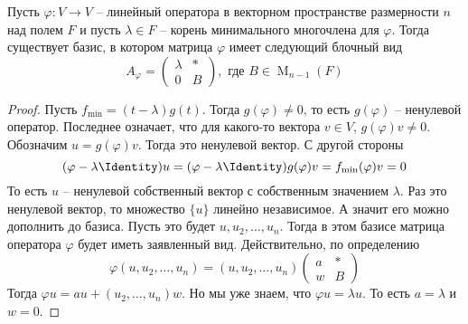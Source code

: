 \begin{claim}
Пусть $\varphi \colon V\to V$ -- линейный оператора в векторном пространстве размерности $n$ над полем $F$ и пусть $\lambda\in F$ -- корень минимального многочлена для $\varphi$.
Тогда существует базис, в котором матрица $\varphi$ имеет следующий блочный вид
\[
A_\varphi = 
\begin{pmatrix}
{\lambda}&{*}\\
{0}&{B}
\end{pmatrix},\text{ где }
B\in \operatorname{M}_{n-1}(F)
\]
\end{claim}
\begin{proof}
Пусть $f_{\text{min}}=(t-\lambda)g(t)$.
Тогда $g(\varphi) \neq 0$, то есть $g(\varphi)$ -- ненулевой оператор.
Последнее означает, что для какого-то вектора $v\in V$, $g(\varphi)v\neq 0$.
Обозначим $u = g(\varphi)v$.
Тогда это ненулевой вектор.
С другой стороны
\[
(\varphi - \lambda \Identity)u = (\varphi - \lambda \Identity)g(\varphi)v = f_\text{min}(\varphi)v = 0
\]
То есть $u$ -- ненулевой собственный вектор с собственным значением $\lambda$.
Раз это ненулевой вектор, то множество $\{u\}$ линейно независимое.
А значит его можно дополнить до базиса.
Пусть это будет $u,u_2,\ldots,u_n$.
Тогда в этом базисе матрица оператора $\varphi$ будет иметь заявленный вид.
Действительно, по определению
\[
\varphi(u, u_2,\ldots, u_n) = (u, u_2,\ldots,u_n)
\begin{pmatrix}
{a}&{*}\\
{w}&{B}
\end{pmatrix}
\]
Тогда $\varphi u = a u + (u_2, \ldots, u_n)w$.
Но мы уже знаем, что $\varphi u = \lambda u$.
То есть $a = \lambda$ и $w = 0$.
\end{proof}

